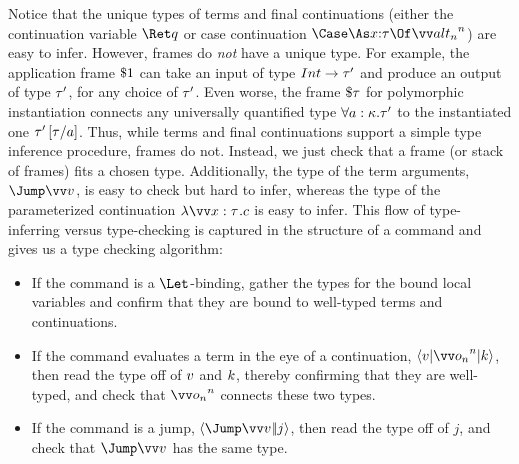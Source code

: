 \documentclass{article}
\begin{document}
Notice that the unique types of terms and final continuations (either the
continuation variable $\ret q$ or case continuation
$\caseas{\ann x \ty}{\vect[n]{\analt_n}}$) are easy to infer.  However, frames
do \emph{not} have a unique type.  For example, the application frame
$\${1}$ can take an input of type $Int \to \tau'$ and produce an output of
type $\tau'$, for any choice of $\tau'$.  Even worse, the frame $\${\tau}$ for
polymorphic instantiation connects any universally quantified type
$\forall a:\kappa.\tau'$ to the instantiated one $\tau'\left[\tau\middle/a\right]$.  Thus, while
terms and final continuations support a simple type inference procedure, frames
do not.  Instead, we just check that a frame (or stack of frames) fits a chosen
type.  Additionally, the type of the term arguments, $\Jump\vect{\tm}$, is easy
to check but hard to infer, whereas the type of the parameterized continuation
$\fnk{\vect{x:\ty}}\cmd$ is easy to infer.  This flow of type-inferring versus
type-checking is captured in the structure of a command and gives us a type
checking algorithm:
\begin{itemize}
\item If the command is a $\Let$-binding, gather the types for the bound local
  variables and confirm that they are bound to well-typed terms and
  continuations.
\item If the command evaluates a term in the eye of a continuation,
  $\braket{\tm | \vect[n]{\frm_n} | \ko}$, then read the type off of $v$ and
  $k$, thereby confirming that they are well-typed, and check that
  $\vect[n]{\frm_n}$ connects these two types.
\item If the command is a jump, $\jump{\vect{\tm}}{j}$, then read the type off
  of $j$, and check that $\Jump\vect{\tm}$ has the same type.
\end{itemize}
\end{document}
